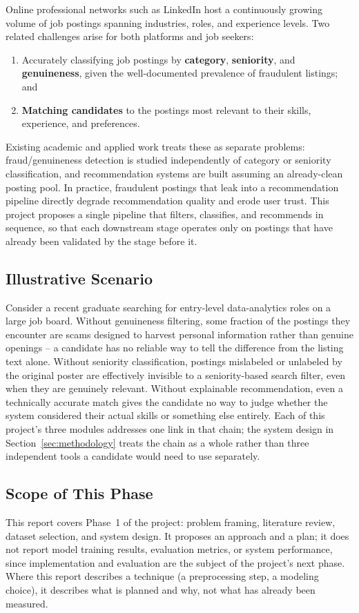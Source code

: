 \documentclass[11pt,a4paper]{article}
\begin{document}
Online professional networks such as LinkedIn host a continuously growing volume of job
postings spanning industries, roles, and experience levels. Two related challenges arise
for both platforms and job seekers:

\begin{enumerate}
    \item Accurately classifying job postings by \textbf{category}, \textbf{seniority},
    and \textbf{genuineness}, given the well-documented prevalence of fraudulent
    listings; and
    \item \textbf{Matching candidates} to the postings most relevant to their skills,
    experience, and preferences.
\end{enumerate}

Existing academic and applied work treats these as separate problems: fraud/genuineness
detection is studied independently of category or seniority classification, and
recommendation systems are built assuming an already-clean posting pool. In practice,
fraudulent postings that leak into a recommendation pipeline directly degrade
recommendation quality and erode user trust. This project proposes a single pipeline
that filters, classifies, and recommends in sequence, so that each downstream stage
operates only on postings that have already been validated by the stage before it.

\subsection*{Illustrative Scenario}
Consider a recent graduate searching for entry-level data-analytics roles on a large job
board. Without genuineness filtering, some fraction of the postings they encounter are
scams designed to harvest personal information rather than genuine openings -- a
candidate has no reliable way to tell the difference from the listing text alone.
Without seniority classification, postings mislabeled or unlabeled by the original
poster are effectively invisible to a seniority-based search filter, even when they are
genuinely relevant. Without explainable recommendation, even a technically accurate
match gives the candidate no way to judge whether the system considered their actual
skills or something else entirely. Each of this project's three modules addresses one
link in that chain; the system design in Section~\ref{sec:methodology} treats the chain
as a whole rather than three independent tools a candidate would need to use separately.

\subsection*{Scope of This Phase}
This report covers Phase~1 of the project: problem framing, literature review, dataset
selection, and system design. It proposes an approach and a plan; it does not report
model training results, evaluation metrics, or system performance, since implementation
and evaluation are the subject of the project's next phase. Where this report describes
a technique (a preprocessing step, a modeling choice), it describes what is planned and
why, not what has already been measured.
\end{document}
